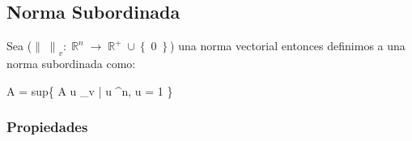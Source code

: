 \documentclass[12pt, fleqn]{report}                             %
\def \Eq {equation}                                             %
\newenvironment{MultiLineEquation*}[1]                          %
        {\begin{\Eq*}\begin{alignedat}{#1}}                         %
        {\end{alignedat}\end{\Eq*}}                                 %
\DeclareMathOperator \Space     {\quad}                         %
\DeclareMathOperator \MiniSpace {\;}                            %
\newcommand \Such           {\MiniSpace | \MiniSpace}           %
\theoremstyle{break}                                            %
\newcommand \lLongTo {\longrightarrow}                          %
\DeclareMathOperator \Reals        {\mathbb{R}}                 %
\newcommand{\Set}[1]            {\left\{ \; #1 \; \right\}}     %
\newcommand{\Abs}[1]    {\left\lVert #1 \right\lVert}           %
\begin{document}
            \clearpage
            \subsection{Norma Subordinada}


                Sea ($\Abs{\;}_v: \Reals^n \lLongTo \Reals^+ \cup \Set{0}$) una norma vectorial
                entonces definimos a una norma subordinada como:
                \begin{MultiLineEquation*}{3}
                    \Abs{A} = sup\Set{\Abs{A \vec u}_v 
                        \Such \vec u \in \Reals^n, \; \Abs{\vec u} = 1}
                \end{MultiLineEquation*}

                \subsubsection{Propiedades}
\end{document}
